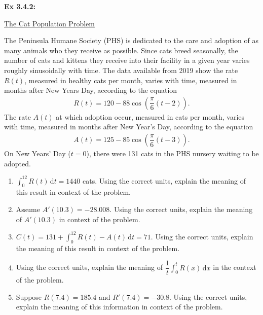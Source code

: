 \begin{tcolorbox}[example]
    \textbf{Ex 3.4.2: } \begin{center}
        \underline{The Cat Population Problem}
    \end{center} \vspace{11pt}

    The Peninsula Humane Society (PHS) is dedicated to the care and adoption of as many animals who they receive as possible. Since cats breed seasonally, the number of cats and kittens they receive into their facility in a given year varies roughly sinusoidally with time. The data available from 2019 show the rate $R(t)$, measured in healthy cats per month, varies with time, measured in months after New Years Day, according to the equation \begin{align*}
        R(t) = 120 - 88\cos \left(\dfrac{\pi}{6}(t - 2)\right).
    \end{align*}
    The rate $A(t)$ at which adoption occur, measured in cats per month, varies with time, measured in months after New Year's Day, according to the equation \begin{align*}
        A(t) = 125 - 85\cos \left(\dfrac{\pi}{6}(t - 3)\right).
    \end{align*}
    On New Years' Day ($t = 0$), there were 131 cats in the PHS nursery waiting to be adopted. \\
    \begin{enumerate}[label=\hspace{11pt}(\alph*), align=left, leftmargin=*, labelsep=0.25em]
        \item $\int_0^{12} R(t) \,\mathrm{d}t = 1440$ cats. Using the correct units, explain the meaning of this result in context of the problem. \\
        \item Assume $A'(10.3) = -28.008$. Using the correct units, explain the meaning of $A'(10.3)$ in context of the problem. \\
        \item $C(t) = 131 + \int_0^{12} R(t) - A(t) \,\mathrm{d}t = 71$. Using the correct units, explain the meaning of this result in context of the problem. \\
        \item Using the correct units, explain the meaning of $\dfrac{1}{t}\int_0^t R(x) \,\mathrm{d}x$ in the context of the problem. \\
        \item Suppose $R(7.4) = 185.4$ and $R'(7.4) = -30.8$. Using the correct units, explain the meaning of this information in context of the problem.
    \end{enumerate}
\end{tcolorbox}
